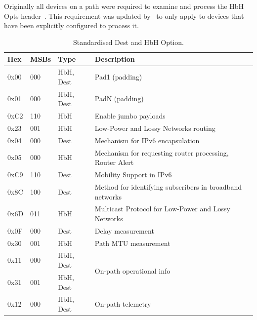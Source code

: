 \documentclass[conference]{IEEEtran}
\begin{document}
Originally all devices on a path were required to examine and process the HbH
Opts header~\cite{rfc2460}. This requirement was updated by~\cite{RFC8200} to
only apply to devices that have been explicitly configured to process it.



\begin{table}[b]
\center
\caption{Standardised Dest and HbH Option.}
\begin{tabular}{p{}|p{}|l|p{}}
Hex  & MSBs & Type      & Description                                              \\
\hline
\hline
0x00 & 000  & HbH, Dest & Pad1 (padding)                                           \\
0x01 & 000  & HbH, Dest & PadN (padding)                                           \\
0xC2 & 110  & HbH       & Enable jumbo payloads                                    \\
0x23 & 001  & HbH       & Low-Power and Lossy Networks routing                     \\
0x04 & 000  & Dest      & Mechanism for IPv6 encapsulation                 \\
0x05 & 000  & HbH       & Mechanism for requesting router processing, Router Alert              \\
0xC9 & 110  & Dest      & Mobility Support in IPv6                                 \\
0x8C & 100  & Dest      & Method for identifying subscribers in broadband networks \\
0x6D & 011  & HbH       & Multicast Protocol for Low-Power and  Lossy Networks     \\
0x0F & 000  & Dest      & Delay measurement                                        \\
0x30 & 001  & HbH       & Path MTU measurement                                     \\
0x11 & 000  & HbH, Dest & \multirow{2}{*}{On-path operational info}                \\
0x31 & 001  & HbH, Dest &                                                          \\
0x12 & 000  & HbH, Dest & On-path telemetry                                       
\end{tabular}
  \label{tbl:options}
\end{table}
\end{document}
